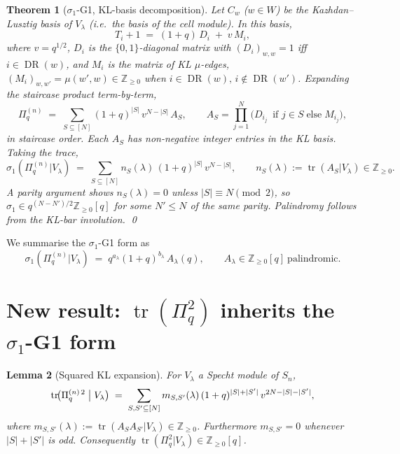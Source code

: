 \documentclass{article}
\newtheorem{theorem}{Theorem}
\newtheorem{lemma}[theorem]{Lemma}
\theoremstyle{definition}
\begin{document}
\begin{theorem}[$\sigma_1$-G1, KL-basis decomposition]\label{thm:s1G1}
Let $C_w$ ($w\in W$) be the Kazhdan--Lusztig basis of $V_\lambda$ (i.e.\ the
basis of the cell module). In this basis,
\[
  T_i + 1 \;=\; (1+q)\,D_i \;+\; v\,M_i,
\]
where $v = q^{1/2}$, $D_i$ is the $\{0,1\}$-diagonal matrix with $(D_i)_{w,w}=1$
iff $i\in \operatorname{DR}(w)$, and $M_i$ is the matrix of KL $\mu$-edges,
$(M_i)_{w,w'} = \mu(w',w) \in \mathbb{Z}_{\geq 0}$ when $i\in\operatorname{DR}(w),\,
i\notin\operatorname{DR}(w')$.
Expanding the staircase product term-by-term,
\begin{equation}\label{eq:KLexpansion}
  \Pi_q^{(n)} \;=\; \sum_{S \subseteq [N]} (1+q)^{|S|}\, v^{N-|S|}\, A_S,
  \qquad
  A_S = \prod_{j=1}^{N} \bigl(D_{i_j}\,\text{ if } j\in S \;\text{else}\; M_{i_j}\bigr),
\end{equation}
in staircase order. Each $A_S$ has non-negative integer entries in the KL
basis. Taking the trace,
\[
  \sigma_1(\Pi_q^{(n)}|V_\lambda)
  \;=\;
  \sum_{S\subseteq[N]} n_S(\lambda)\,(1+q)^{|S|}\,v^{N-|S|},
  \qquad
  n_S(\lambda) := \operatorname{tr}(A_S | V_\lambda) \in \mathbb{Z}_{\geq 0}.
\]
A parity argument shows $n_S(\lambda) = 0$ unless $|S|\equiv N \pmod 2$, so
$\sigma_1\in q^{(N-N')/2}\mathbb{Z}_{\geq 0}[q]$ for some $N'\leq N$ of the same
parity. Palindromy follows from the KL-bar involution. \qed
\end{theorem}

We summarise the $\sigma_1$-G1 form as
\[
  \sigma_1(\Pi_q^{(n)}|V_\lambda) \;=\; q^{a_\lambda}(1+q)^{b_\lambda}\,A_\lambda(q),
  \qquad A_\lambda \in \mathbb{Z}_{\geq 0}[q]\ \text{palindromic.}
\]

\section{New result: $\operatorname{tr}(\Pi_q^2)$ inherits the $\sigma_1$-G1 form}

\begin{lemma}[Squared KL expansion]\label{lem:trPi2}
For $V_\lambda$ a Specht module of $S_n$,
\begin{equation}\label{eq:trPi2}
  \operatorname{tr}\!\bigl(\Pi_q^{(n)\,2}\bigm|V_\lambda\bigr)
  \;=\;
  \sum_{S,S'\subseteq[N]} m_{S,S'}(\lambda)\,(1+q)^{|S|+|S'|}\, v^{2N-|S|-|S'|},
\end{equation}
where $m_{S,S'}(\lambda) := \operatorname{tr}(A_S A_{S'} | V_\lambda) \in \mathbb{Z}_{\geq 0}$.
Furthermore $m_{S,S'} = 0$ whenever $|S|+|S'|$ is odd.
Consequently $\operatorname{tr}(\Pi_q^2|V_\lambda) \in \mathbb{Z}_{\geq 0}[q]$.
\end{lemma}
\end{document}
